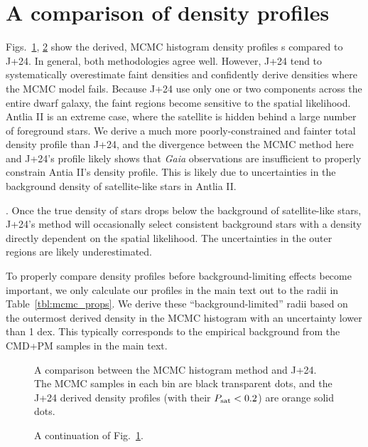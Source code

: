 \section{A comparison of density
profiles}\label{a-comparison-of-density-profiles}

Figs.~\ref{fig:mcmc_hists}, \ref{fig:mcmc_hists2} show the derived, MCMC
histogram density profiles s compared to J+24. In general, both
methodologies agree well. However, J+24 tend to systematically
overestimate faint densities and confidently derive densities where the
MCMC model fails. Because J+24 use only one or two components across the
entire dwarf galaxy, the faint regions become sensitive to the spatial
likelihood. Antlia II is an extreme case, where the satellite is hidden
behind a large number of foreground stars. We derive a much more
poorly-constrained and fainter total density profile than J+24, and the
divergence between the MCMC method here and J+24's profile likely shows
that \emph{Gaia} observations are insufficient to properly constrain
Antia II's density profile. This is likely due to uncertainties in the
background density of satellite-like stars in Antlia II.

. Once the true density of stars drops below the background of
satellite-like stars, J+24's method will occasionally select consistent
background stars with a density directly dependent on the spatial
likelihood. The uncertainties in the outer regions are likely
underestimated.

To properly compare density profiles before background-limiting effects
become important, we only calculate our profiles in the main text out to
the radii in Table~\ref{tbl:mcmc_props}. We derive these
``background-limited'' radii based on the outermost derived density in
the MCMC histogram with an uncertainty lower than 1 dex. This typically
corresponds to the empirical background from the CMD+PM samples in the
main text.

\begin{figure}
\centering
{}
\caption[Probabilistic density profiles]{A comparison between the MCMC
histogram method and J+24. The MCMC samples in each bin are black
transparent dots, and the J+24 derived density profiles (with their
\(P_{\rm sat} < 0.2\)) are orange solid dots.}\label{fig:mcmc_hists}
\end{figure}

\begin{figure}
\centering
{}
\caption[Probabilistic density profiles continued]{A continuation of
Fig.~\ref{fig:mcmc_hists}.}\label{fig:mcmc_hists2}
\end{figure}

